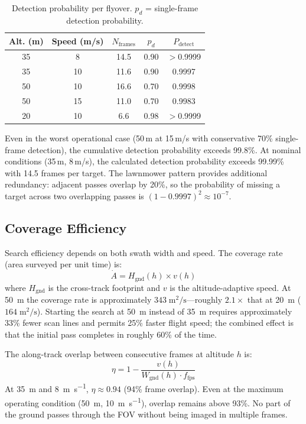 \documentclass[10pt,a4paper]{article}
\begin{document}
\begin{table}[ht]
  \centering
  \caption{Detection probability per flyover. $p_d$ = single-frame detection probability.}\label{tab:detect-prob}
  \begin{tabular}{@{}c c c c c@{}}
    \toprule
    \textbf{Alt. (m)} & \textbf{Speed (m/s)} & $N_{\mathrm{frames}}$ & $p_d$ & $P_{\mathrm{detect}}$ \\
    \midrule
    35 &  8 & 14.5 & 0.90 & $>$0.9999 \\
    35 & 10 & 11.6 & 0.90 & 0.9997 \\
    50 & 10 & 16.6 & 0.70 & 0.9998 \\
    50 & 15 & 11.0 & 0.70 & 0.9983 \\
    20 & 10 &  6.6 & 0.98 & $>$0.9999 \\
    \bottomrule
  \end{tabular}
\end{table}

Even in the worst operational case (50\,m at 15\,m/s with conservative 70\% single-frame detection), the cumulative detection probability exceeds 99.8\%. At nominal conditions (35\,m, 8\,m/s), the calculated detection probability exceeds 99.99\% with 14.5 frames per target. The lawnmower pattern provides additional redundancy: adjacent passes overlap by 20\%, so the probability of missing a target across two overlapping passes is $(1 - 0.9997)^2 \approx 10^{-7}$.

\subsection{Coverage Efficiency}\label{sec:perf:coverage}

Search efficiency depends on both swath width and speed. The coverage rate (area surveyed per unit time) is:
\begin{equation}\label{eq:coverage-rate}
  \dot{A} = H_{\mathrm{gnd}}(h) \times v(h)
\end{equation}
where $H_{\mathrm{gnd}}$ is the cross-track footprint and $v$ is the altitude-adaptive speed. At \SI{50}{\metre} the coverage rate is approximately $343\;\text{m}^2/\text{s}$---roughly $2.1\times$ that at \SI{20}{\metre} ($164\;\text{m}^2/\text{s}$). Starting the search at \SI{50}{\metre} instead of \SI{35}{\metre} requires approximately 33\% fewer scan lines and permits 25\% faster flight speed; the combined effect is that the initial pass completes in roughly 60\% of the time.

The along-track overlap between consecutive frames at altitude $h$ is:
\begin{equation}\label{eq:overlap}
  \eta = 1 - \frac{v(h)}{W_{\mathrm{gnd}}(h) \cdot f_{\mathrm{fps}}}
\end{equation}
At \SI{35}{\metre} and \SI{8}{\metre\per\second}, $\eta \approx 0.94$ (94\% frame overlap). Even at the maximum operating condition (\SI{50}{\metre}, \SI{10}{\metre\per\second}), overlap remains above 93\%. No part of the ground passes through the FOV without being imaged in multiple frames.
\end{document}
